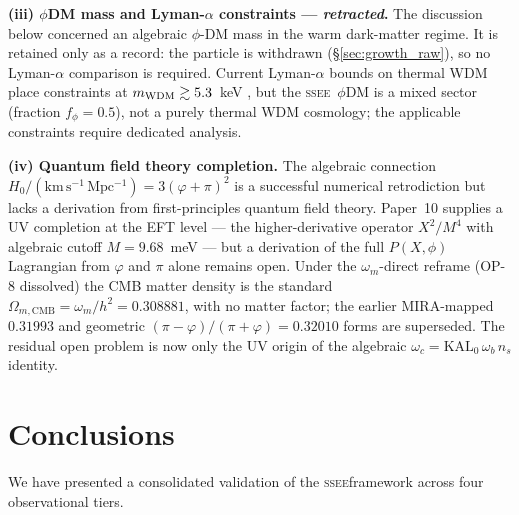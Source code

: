 \documentclass[12pt,a4paper]{article}
\newcommand{\SSEE}{\textsc{ssee}}
\newcommand{\phiG}{\varphi}
\begin{document}
\textbf{(iii) $\phi$DM mass and Lyman-$\alpha$ constraints --- \emph{retracted}.}
The discussion below concerned an algebraic $\phi$-DM mass in the warm
dark-matter regime. It is retained only as a record: the particle is withdrawn
(\S\ref{sec:growth_raw}), so no Lyman-$\alpha$ comparison is required.
Current Lyman-$\alpha$ bounds on thermal WDM place constraints at
$m_{\rm WDM} \gtrsim 5.3$~keV \citep{Irsic2017}, but the \SSEE\ $\phi$DM
is a mixed sector (fraction $f_\phi = 0.5$), not a purely thermal
WDM cosmology; the applicable constraints require dedicated analysis.

\textbf{(iv) Quantum field theory completion.}
The algebraic connection $H_0/(\mathrm{km\,s^{-1}\,Mpc^{-1}}) = 3(\phiG+\pi)^2$ is a successful numerical
retrodiction but lacks a derivation from first-principles quantum field theory.
Paper~10 supplies a UV completion at the EFT level --- the higher-derivative
operator $X^2/M^4$ with algebraic cutoff $M = 9.68$~meV --- but a derivation of
the full $P(X,\phi)$ Lagrangian from $\phiG$ and $\pi$ alone remains open.
Under the $\omega_m$-direct reframe (OP-8 dissolved) the CMB matter density is
the standard $\Omega_{m,\mathrm{CMB}} = \omega_m/h^2 = 0.308881$, with no matter
factor; the earlier MIRA-mapped $0.31993$ and geometric
$(\pi-\phiG)/(\pi+\phiG)=0.32010$ forms are superseded. The residual open
problem is now only the UV origin of the algebraic $\omega_c=\mathrm{KAL_0}\,\omega_b\,n_s$
identity.


\section{Conclusions}
\label{sec:conclusions}

We have presented a consolidated validation of the \SSEE framework
across four observational tiers.
\end{document}
